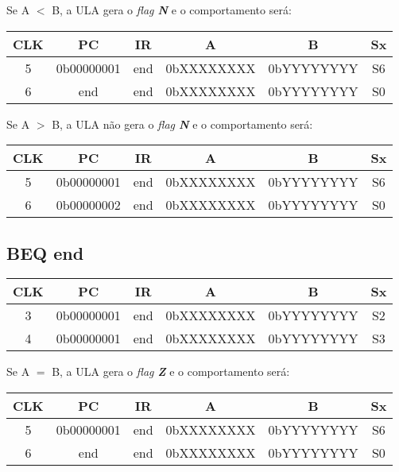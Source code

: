 \documentclass[../main.tex]{subfiles}
\begin{document}
Se A $<$ B, a ULA gera o \textit{flag \textbf{N}} e o comportamento será:

\begin{table}[H]
	\centering
	\begin{tabular}{|c|c|c|c|c|c|} %
	\hline
	CLK & PC & IR & A& B & Sx \\\hline
	5 & 0b00000001 & end & 0bXXXXXXXX & 0bYYYYYYYY & S6 \\\hline 
	6 & end & end & 0bXXXXXXXX & 0bYYYYYYYY & S0 \\\hline 	
	\end{tabular}	
\end{table}

Se A $>$ B, a ULA não gera o \textit{flag \textbf{N}} e o comportamento será:

\begin{table}[H]
	\centering
	\begin{tabular}{|c|c|c|c|c|c|} %
	\hline
	CLK & PC & IR & A& B & Sx \\\hline
	5 & 0b00000001 & end & 0bXXXXXXXX & 0bYYYYYYYY & S6 \\\hline 
	6 & 0b00000002 & end & 0bXXXXXXXX & 0bYYYYYYYY & S0 \\\hline 	
	\end{tabular}	
\end{table}

\subsection{BEQ end}

\begin{table}[H]
	\centering
	\begin{tabular}{|c|c|c|c|c|c|} %
	\hline
	CLK & PC & IR & A& B & Sx \\\hline
	3 & 0b00000001 & end & 0bXXXXXXXX & 0bYYYYYYYY & S2 \\\hline 
	4 & 0b00000001 & end & 0bXXXXXXXX & 0bYYYYYYYY & S3 \\\hline 	
	\end{tabular}	
\end{table}

Se A $=$ B, a ULA gera o \textit{flag \textbf{Z}} e o comportamento será:

\begin{table}[H]
	\centering
	\begin{tabular}{|c|c|c|c|c|c|} %
	\hline
	CLK & PC & IR & A& B & Sx \\\hline
	5 & 0b00000001 & end & 0bXXXXXXXX & 0bYYYYYYYY & S6 \\\hline 
	6 & end & end & 0bXXXXXXXX & 0bYYYYYYYY & S0 \\\hline 	
	\end{tabular}	
\end{table}
\end{document}
